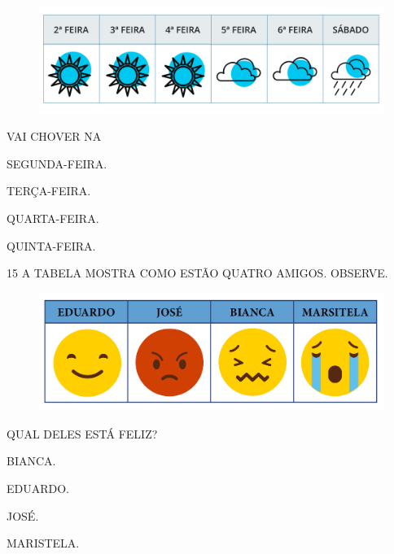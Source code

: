 \begin{figure}[H]
\includegraphics[width=\textwidth]{./media/SAEB_1ANO_MAT_FIGURA127.png}
\end{figure}

VAI CHOVER NA

\begin{escolha}[itemsep=0pt]
\item SEGUNDA-FEIRA.

\item TERÇA-FEIRA.

\item QUARTA-FEIRA.

\item QUINTA-FEIRA.
\end{escolha}

\num{15} A TABELA MOSTRA COMO ESTÃO QUATRO AMIGOS. OBSERVE.


\begin{figure}[H]
\includegraphics[width=\textwidth]{./media/SAEB_1ANO_MAT_FIGURA128.png}
\end{figure}

QUAL DELES ESTÁ FELIZ?

\begin{escolha}[itemsep=0pt]
\item BIANCA.

\item EDUARDO.

\item JOSÉ.

\item MARISTELA.
\end{escolha}

